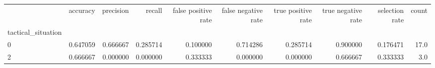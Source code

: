 \begin{tabular}{lrrrrrrrrr}
\toprule
{} &  accuracy &  precision &    recall &  false positive rate &  false negative rate &  true positive rate &  true negative rate &  selection rate &  count \\
tactical\_situation &           &            &           &                      &                      &                     &                     &                 &        \\
\midrule
0                  &  0.647059 &   0.666667 &  0.285714 &             0.100000 &             0.714286 &            0.285714 &            0.900000 &        0.176471 &   17.0 \\
2                  &  0.666667 &   0.000000 &  0.000000 &             0.333333 &             0.000000 &            0.000000 &            0.666667 &        0.333333 &    3.0 \\
\bottomrule
\end{tabular}
